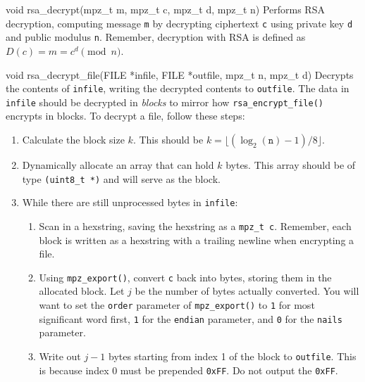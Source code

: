 \begin{funcdoc}{void rsa\_decrypt(mpz\_t m, mpz\_t c, mpz\_t d,
mpz\_t n)}
  Performs RSA decryption, computing message \texttt{m} by decrypting
  ciphertext \texttt{c} using private key \texttt{d} and public modulus
  \texttt{n}. Remember, decryption with RSA is defined as $D(c) = m =
        c^d \pmod{n}$.
\end{funcdoc}

\begin{funcdoc}{void rsa\_decrypt\_file(FILE *infile, FILE *outfile,
mpz\_t n, mpz\_t d)}
  Decrypts the contents of \texttt{infile}, writing the decrypted
  contents to \texttt{outfile}. The data in \texttt{infile} should be
  decrypted in \emph{blocks} to mirror how \texttt{rsa\_encrypt\_file()}
  encrypts in blocks. To decrypt a file, follow these steps:
  \begin{enumerate}
    \item Calculate the block size $k$. This should be
      $k = \lfloor(\log_2({\texttt{n}}) - 1) / 8\rfloor$.
    \item Dynamically allocate an array that can hold $k$ bytes. This
      array should be of type \texttt{(uint8\_t *)} and will serve as
      the block.
    \item While there are still unprocessed bytes in \texttt{infile}:
      \begin{enumerate}
        \item Scan in a hexstring, saving the hexstring as a
          \texttt{mpz\_t c}. Remember, each block is written as a
          hexstring with a trailing newline when encrypting a file.
        \item Using \texttt{mpz\_export()}, convert \texttt{c} back into
          bytes, storing them in the allocated block. Let $j$ be the
          number of bytes actually converted. You will want to set the
          \texttt{order} parameter of \texttt{mpz\_export()} to
          \texttt{1} for most significant word first, \texttt{1} for the
          \texttt{endian} parameter, and \texttt{0} for the
          \texttt{nails} parameter.
        \item Write out $j - 1$ bytes starting from index 1 of the block
          to \texttt{outfile}. This is because index 0 must be prepended
          \texttt{0xFF}. Do not output the \texttt{0xFF}.
      \end{enumerate}
  \end{enumerate}

\end{funcdoc}

